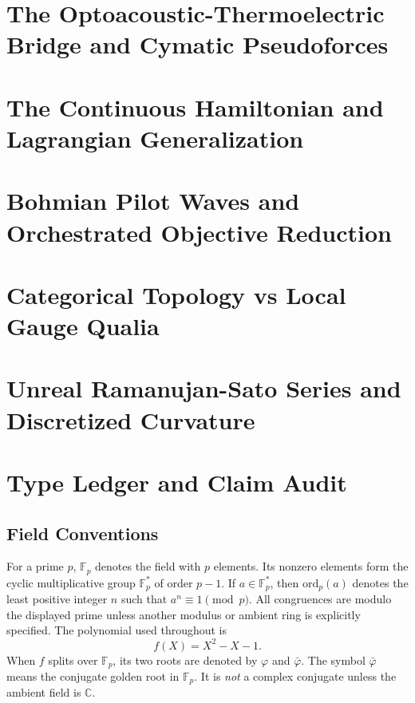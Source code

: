 \documentclass[12pt,oneside]{book}
\theoremstyle{principia}
\theoremstyle{definition}
\theoremstyle{remark}
\providecommand{\CC}{\mathbb{C}}
\providecommand{\FF}{\mathbb{F}}
\providecommand{\vp}{\varphi}
\providecommand{\vpbar}{\bar{\varphi}}
\begin{document}
\chapter[Optoacoustic Cymatics]{The Optoacoustic-Thermoelectric Bridge and Cymatic Pseudoforces}\label{ch:optoacoustic}


\chapter[Continuous Hamiltonian Mechanics]{The Continuous Hamiltonian and Lagrangian Generalization}\label{ch:continuous}


\chapter[Bohmian Mechanics and Orch-OR]{Bohmian Pilot Waves and Orchestrated Objective Reduction}\label{ch:bohm_orchor}


\chapter[Categorical Qualia]{Categorical Topology vs Local Gauge Qualia}\label{ch:categorical_qualia}


\chapter[Unreal Ramanujan-Sato]{Unreal Ramanujan-Sato Series and Discretized Curvature}\label{ch:ramanujan_sato}


\appendix


\chapter[Type Ledger]{Type Ledger and Claim Audit}

\section{Field Conventions}
For a prime $p$, $\FF_p$ denotes the field with $p$ elements. Its nonzero elements form the cyclic multiplicative group $\FF_p^*$ of order $p - 1$. If $a \in \FF_p^*$, then $\mathrm{ord}_p(a)$ denotes the least positive integer $n$ such that $a^n \equiv 1 \pmod{p}$. All congruences are modulo the displayed prime unless another modulus or ambient ring is explicitly specified. The polynomial used throughout is
\[
f(X) = X^2 - X - 1.
\]
When $f$ splits over $\FF_p$, its two roots are denoted by $\vp$ and $\vpbar$. The symbol $\vpbar$ means the conjugate golden root in $\FF_p$. It is \emph{not} a complex conjugate unless the ambient field is $\CC$.
\end{document}
